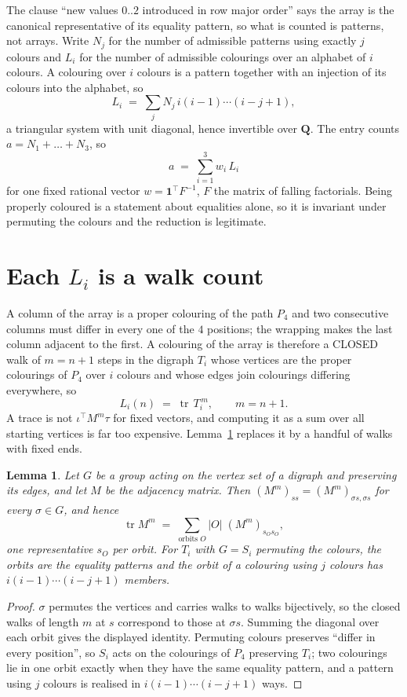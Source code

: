 \documentclass[11pt,a4paper]{article}
\theoremstyle{plain}
\newtheorem{lemma}[theorem]{Lemma}
\theoremstyle{definition}
\begin{document}
The clause ``new values $0..2$ introduced in row major order'' says the array is the
canonical representative of its equality pattern, so what is counted is patterns, not arrays.
Write $N_j$ for the number of admissible patterns using exactly $j$ colours and $L_i$ for the
number of admissible colourings over an alphabet of $i$ colours. A colouring over $i$ colours
is a pattern together with an injection of its colours into the alphabet, so
\[
L_i\;=\;\sum_j N_j\,i(i-1)\cdots(i-j+1),
\]
a triangular system with unit diagonal, hence invertible over $\mathbf{Q}$. The entry counts
$a=N_1+\dots+N_{3}$, so
\[
a\;=\;\sum_{i=1}^{3}w_i\,L_i
\]
for one fixed rational vector $w=\mathbf{1}^{\!\top}F^{-1}$, $F$ the matrix of falling
factorials. Being properly coloured is a statement about equalities alone, so it is invariant
under permuting the colours and the reduction is legitimate.

\section{Each $L_i$ is a walk count}

A column of the array is a proper colouring of the path $P_{4}$ and two consecutive
columns must differ in every one of the $4$ positions; the wrapping makes the last column
adjacent to the first. A colouring of the array is therefore a CLOSED walk of $m=n+1$ steps
in the digraph $T_i$ whose vertices are the proper colourings of $P_{4}$ over $i$ colours
and whose edges join colourings differing everywhere, so
\[
L_i(n)\;=\;\operatorname{tr}\,T_i^{\,m},\qquad m=n+1.
\]
A trace is not $\iota^{\!\top}M^m\tau$ for fixed vectors, and computing it as a sum over all
starting vertices is far too expensive. Lemma~\ref{lem:trace} replaces it by a handful of
walks with fixed ends.

\begin{lemma}\label{lem:trace}
Let $G$ be a group acting on the vertex set of a digraph and preserving its edges, and let $M$
be the adjacency matrix. Then $(M^m)_{ss}=(M^m)_{\sigma s,\sigma s}$ for every
$\sigma\in G$, and hence
\[
\operatorname{tr} M^m\;=\;\sum_{\text{orbits }O}|O|\;(M^m)_{s_O s_O} ,
\]
one representative $s_O$ per orbit. For $T_i$ with $G=S_i$ permuting the colours, the orbits
are the equality patterns and the orbit of a colouring using $j$ colours has
$i(i-1)\cdots(i-j+1)$ members.
\end{lemma}

\begin{proof}
$\sigma$ permutes the vertices and carries walks to walks bijectively, so the closed walks of
length $m$ at $s$ correspond to those at $\sigma s$. Summing the diagonal over each orbit
gives the displayed identity. Permuting colours preserves ``differ in every position'', so
$S_i$ acts on the colourings of $P_{4}$ preserving $T_i$; two colourings lie in one orbit
exactly when they have the same equality pattern, and a pattern using $j$ colours is realised
in $i(i-1)\cdots(i-j+1)$ ways.
\end{proof}
\end{document}
